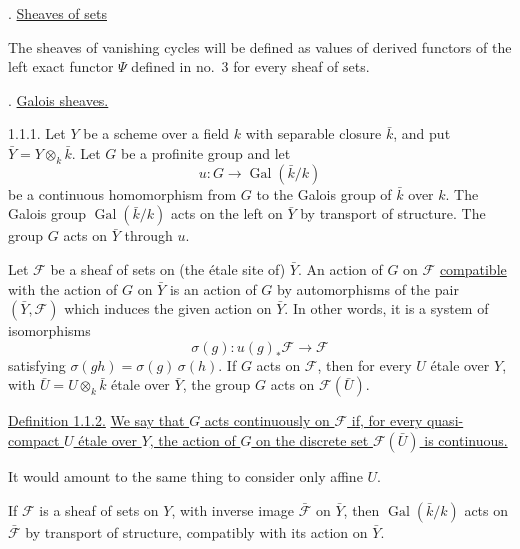 
. \underline{Sheaves of sets}

The sheaves of vanishing cycles will be defined as values of derived
functors of the left exact functor $\Psi$ defined in no.~3 for every
sheaf of sets.

. \underline{Galois sheaves.}

1.1.1. Let $Y$ be a scheme over a field $k$ with separable closure
$\bar{k}$, and put $\bar{Y}=Y\otimes_k\bar{k}$.  Let $G$ be a profinite
group and let
\begin{equation*}
u:G\longrightarrow\operatorname{Gal}(\bar{k}/k)
\end{equation*}
be a continuous homomorphism from $G$ to the Galois group of $\bar{k}$
over $k$.  The Galois group $\operatorname{Gal}(\bar{k}/k)$ acts on the
left on $\bar{Y}$ by transport of structure.  The group $G$ acts on
$\bar{Y}$ through $u$.

Let $\mathcal F$ be a sheaf of sets on (the \'{e}tale site of) $\bar Y$.
An action of $G$ on $\mathcal F$ \underline{compatible} with the action
of $G$ on $\bar Y$ is an action of $G$ by automorphisms of the pair
$(\bar Y,\mathcal F)$ which induces the given action on $\bar Y$.  In
other words, it is a system of isomorphisms
\begin{equation*}
\sigma(g):u(g)_*\mathcal F\longrightarrow\mathcal F
\end{equation*}
satisfying $\sigma(gh)=\sigma(g)\,\sigma(h)$.  If $G$ acts on
$\mathcal F$, then for every $U$ \'{e}tale over $Y$, with
$\bar U=U\otimes_k\bar k$ \'{e}tale over $\bar Y$, the group $G$ acts on
$\mathcal F(\bar U)$.

\underline{Definition 1.1.2.} \underline{We say that $G$ acts
continuously on $\mathcal F$ if, for every quasi-compact $U$ \'{e}tale
over $Y$, the action of $G$ on the discrete set $\mathcal F(\bar U)$ is
continuous.}

It would amount to the same thing to consider only affine $U$.

If $\mathcal F$ is a sheaf of sets on $Y$, with inverse image
$\bar{\mathcal F}$ on $\bar Y$, then
$\operatorname{Gal}(\bar k/k)$ acts on $\bar{\mathcal F}$ by transport
of structure, compatibly with its action on $\bar Y$.

